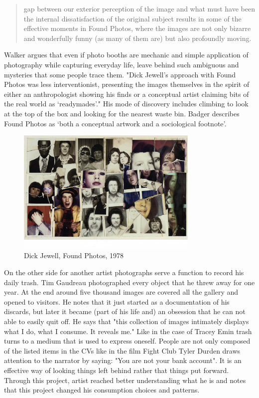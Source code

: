\begin{quote}
gap between our exterior perception of the image and what must have been the internal dissatisfaction of the original subject results in some of the effective moments in Found Photos, where the images are not only bizarre and wonderfully funny (as many of them are) but also profoundly moving.
\end{quote}

Walker argues that even if photo booths are mechanic and simple application of photography while capturing everyday life, leave behind such ambiguous and mysteries that some people trace them. "Dick Jewell’s approach with Found Photos was less interventionist, presenting the images themselves in the spirit of either an anthropologist showing his finds or a conceptual artist claiming bits of the real world as ‘readymades’." His mode of discovery includes climbing to look at the top of the box and looking for the nearest waste bin. Badger describes Found Photos as ‘both a conceptual artwork and a sociological footnote’.

\begin{figure}[h!]
  \centering
  \includegraphics[height=6cm]{graphics/DickJewell_FoundPhotos.jpg}
  \caption{Dick Jewell, Found Photos, 1978}
  \label{fig:DickJewell_FoundPhotos}
\end{figure}

On the other side for another artist photographs serve a function to record his daily trash. Tim Gaudreau photographed every object that he threw away for one year. At the end around five thousand images are covered all the gallery and opened to visitors. He notes that it just started as a documentation of his discards, but later it became (part of his life and) an obsession that he can not able to easily quit off. He says that "this collection of images intimately displays what I do, what I consume. It reveals me." Like in the case of Tracey Emin trash turns to a medium that is used to express oneself. People are not only composed of the listed items in the CVs like in the film Fight Club Tyler Durden draws attention to the narrator by saying: "You are not your bank account". It is an effective way of looking things left behind rather that things put forward. Through this project, artist reached better understanding what he is and notes that this project changed his consumption choices and patterns.

